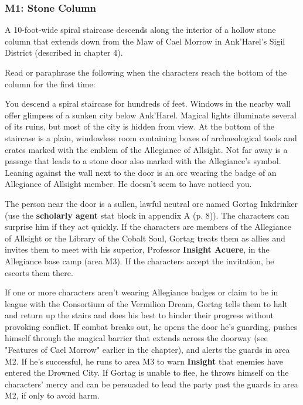\documentclass[a4paper, 11pt, bg=full, twocolumn, nooutline]{dndbook}
\begin{document}
\subsubsection{M1: Stone Column}

A 10-foot-wide spiral staircase descends along the interior of a hollow stone column that extends down from the Maw of Cael Morrow in Ank'Harel's Sigil District (described in chapter 4).

Read or paraphrase the following when the characters reach the bottom of the column for the first time:

\begin{DndReadAloud}
You descend a spiral staircase for hundreds of feet. Windows in the nearby wall offer glimpses of a sunken city below Ank'Harel. Magical lights illuminate several of its ruins, but most of the city is hidden from view.
At the bottom of the staircase is a plain, windowless room containing boxes of archaeological tools and crates marked with the emblem of the Allegiance of Allsight. Not far away is a passage that leads to a stone door also marked with the Allegiance's symbol. Leaning against the wall next to the door is an orc wearing the badge of an Allegiance of Allsight member. He doesn't seem to have noticed you.
\end{DndReadAloud}

The person near the door is a sullen, lawful neutral orc named Gortag Inkdrinker (use the \textbf{scholarly agent} stat block in appendix A (p. 8)). The characters can surprise him if they act quickly. If the characters are members of the Allegiance of Allsight or the Library of the Cobalt Soul, Gortag treats them as allies and invites them to meet with his superior, Professor \textbf{Insight Acuere}, in the Allegiance base camp (area M3). If the characters accept the invitation, he escorts them there.

If one or more characters aren't wearing Allegiance badges or claim to be in league with the Consortium of the Vermilion Dream, Gortag tells them to halt and return up the stairs and does his best to hinder their progress without provoking conflict. If combat breaks out, he opens the door he's guarding, pushes himself through the magical barrier that extends across the doorway (see "Features of Cael Morrow" earlier in the chapter), and alerts the guards in area M2. If he's successful, he runs to area M3 to warn \textbf{Insight} that enemies have entered the Drowned City. If Gortag is unable to flee, he throws himself on the characters' mercy and can be persuaded to lead the party past the guards in area M2, if only to avoid harm.
\end{document}
